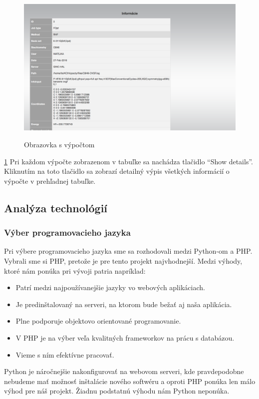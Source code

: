 \documentclass[12pt,a4paper]{article}
\begin{document}
\begin{figure}[H]
	\caption{Obrazovka s výpočtom}
	\includegraphics[width=\textwidth]{item}
	\label{fig:ui3}
\end{figure}
\ref{fig:ui3}
Pri každom výpočte zobrazenom v tabuľke sa nachádza tlačidlo “Show details”. Kliknutím na toto tlačidlo sa zobrazí detailný výpis všetkých informácií o výpočte v prehľadnej tabuľke.

\subsection{Analýza technológií}

\subsubsection{Výber programovacieho jazyka}
Pri výbere programovacieho jazyka sme sa rozhodovali medzi Python-om a PHP. Vybrali sme si PHP, pretože je pre tento projekt najvhodnejší. Medzi výhody, ktoré nám ponúka pri vývoji patria napríklad:
\begin{itemize}
	\item Patrí medzi najpoužívanejšie jazyky vo webových aplikáciach.
	\item Je predinštalovaný na serveri, na ktorom bude bežať aj naša aplikácia.
	\item Plne podporuje objektovo orientované programovanie.
	\item V PHP je na výber veľa kvalitných frameworkov na prácu s databázou.
	\item Vieme s ním efektívne pracovať.
\end{itemize}
Python je náročnejšie nakonfigurovať na webovom serveri, kde pravdepodobne nebudeme mať možnosť inštalácie nového softwéru a oproti PHP ponúka len málo výhod pre náš projekt. Žiadnu podstatnú výhodu nám Python neponúka.
\end{document}
